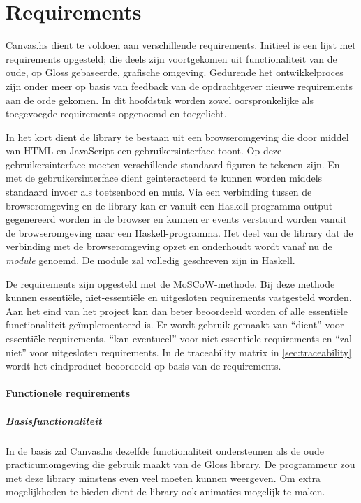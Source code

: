 \chapter{Requirements} \label{hoofdstuk:requirements}
Canvas.hs dient te voldoen aan verschillende requirements. Initieel is een lijst met requirements opgesteld; die deels zijn voortgekomen uit functionaliteit van de oude, op Gloss gebaseerde, grafische omgeving. Gedurende het ontwikkelproces zijn onder meer op basis van feedback van de opdrachtgever nieuwe requirements aan de orde gekomen. In dit hoofdstuk worden zowel oorspronkelijke als toegevoegde requirements opgenoemd en toegelicht.

In het kort dient de library te bestaan uit een browseromgeving die door middel van HTML en JavaScript een gebruikersinterface toont. Op deze gebruikersinterface moeten verschillende standaard figuren te tekenen zijn. En met de gebruikersinterface dient geinteracteerd te kunnen worden middels standaard invoer als toetsenbord en muis. Via een verbinding tussen de browseromgeving en de library kan er vanuit een Haskell-programma output gegenereerd worden in de browser en kunnen er events verstuurd worden vanuit de browseromgeving naar een Haskell-programma. Het deel van de library dat de verbinding met de browseromgeving opzet en onderhoudt wordt vanaf nu de \emph{module} genoemd. De module zal volledig geschreven zijn in Haskell.

De requirements zijn opgesteld met de MoSCoW-methode. Bij deze methode kunnen essenti\"ele, niet-essenti\"ele en uitgesloten requirements vastgesteld worden. Aan het eind van het project kan dan beter beoordeeld worden of alle essenti\"ele functionaliteit ge\"implementeerd is. Er wordt gebruik gemaakt van ``dient'' voor essenti\"ele requirements, ``kan eventueel'' voor niet-essentiele requirements en ``zal niet'' voor uitgesloten requirements. In de traceability matrix in \autoref{sec:traceability} wordt het eindproduct beoordeeld op basis van de requirements.

\subsubsection{Functionele requirements}
\paragraph{Basisfunctionaliteit} In de basis zal Canvas.hs dezelfde functionaliteit ondersteunen als de oude practicumomgeving die gebruik maakt van de Gloss library. De programmeur zou met deze library minstens even veel moeten kunnen weergeven. Om extra mogelijkheden te bieden dient de library ook animaties mogelijk te maken.

